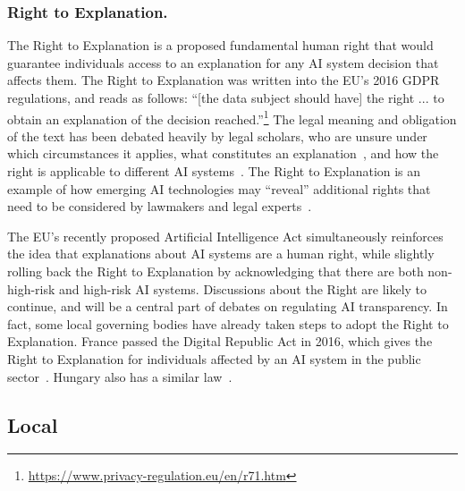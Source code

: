 \documentclass[sigconf, nonacm]{acmart}
\begin{document}
\subsubsection{Right to Explanation.}

The Right to Explanation is a proposed fundamental human right that would guarantee individuals access to an explanation for any AI system decision that affects them. The Right to Explanation was written into the EU's 2016 GDPR regulations, and reads as follows: ``[the data subject should have] the right ... to obtain an explanation of the decision reached.''\footnote{\url{https://www.privacy-regulation.eu/en/r71.htm}} The legal meaning and obligation of the text has been debated heavily by legal scholars, who are unsure under which circumstances it applies, what constitutes an explanation~\cite{DBLP:conf/fat/SelbstP18}, and 
how the right is applicable to different AI systems~\cite{doshi2017accountability}. The Right to Explanation is an example of how emerging AI technologies may ``reveal'' additional rights that need to be considered by lawmakers and legal experts~\cite{10.1145/3306618.3314274}.

The EU's recently proposed Artificial Intelligence Act simultaneously reinforces the idea that explanations about AI systems are a human right, while slightly rolling back the Right to Explanation by acknowledging that there are both non-high-risk and high-risk AI systems. Discussions about the Right are likely to continue, and will be a central part of debates on regulating AI transparency. In fact, some local governing bodies have already taken steps to adopt the Right to Explanation. France passed the Digital Republic Act in 2016, which gives the Right to Explanation for individuals affected by an AI system in the public sector~\cite{edwards2018enslaving}. Hungary also has a similar law~\cite{malgieri2019automated}.

\subsection{Local}
\end{document}
